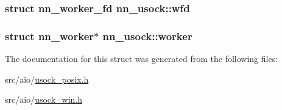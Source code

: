 \subsubsection[{wfd}]{\setlength{\rightskip}{0pt plus 5cm}struct {\bf nn\+\_\+worker\+\_\+fd} nn\+\_\+usock\+::wfd}\hypertarget{structnn__usock_a6dcccc01004ab1aed3b65dfdf7741153}{}\label{structnn__usock_a6dcccc01004ab1aed3b65dfdf7741153}
\subsubsection[{worker}]{\setlength{\rightskip}{0pt plus 5cm}struct {\bf nn\+\_\+worker}$\ast$ nn\+\_\+usock\+::worker}\hypertarget{structnn__usock_a1f386fc2676edf4e186d6f675fcf2922}{}\label{structnn__usock_a1f386fc2676edf4e186d6f675fcf2922}


The documentation for this struct was generated from the following files\+:\begin{DoxyCompactItemize}
\item 
src/aio/\hyperlink{usock__posix_8h}{usock\+\_\+posix.\+h}\item 
src/aio/\hyperlink{usock__win_8h}{usock\+\_\+win.\+h}\end{DoxyCompactItemize}

